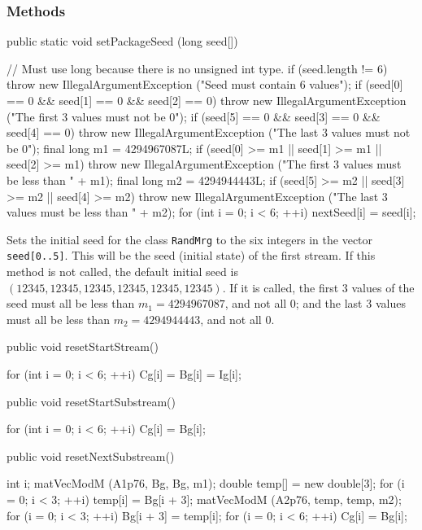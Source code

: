 \subsubsection* {Methods}
\begin{code}

   public static void setPackageSeed (long seed[]) \begin{hide} {
      // Must use long because there is no unsigned int type.
      if (seed.length != 6)
         throw new IllegalArgumentException ("Seed must contain 6 values");
      if (seed[0] == 0 && seed[1] == 0 && seed[2] == 0)
         throw new IllegalArgumentException ("The first 3 values must not be 0");
      if (seed[5] == 0 && seed[3] == 0 && seed[4] == 0)
         throw new IllegalArgumentException ("The last 3 values must not be 0");
      final long m1 = 4294967087L;
      if (seed[0] >= m1 || seed[1] >= m1 || seed[2] >= m1)
         throw new IllegalArgumentException ("The first 3 values must be less than " + m1);
      final long m2 = 4294944443L;
      if (seed[5] >= m2 || seed[3] >= m2 || seed[4] >= m2)
         throw new IllegalArgumentException ("The last 3 values must be less than " + m2);
      for (int i = 0; i < 6;  ++i)  nextSeed[i] = seed[i];
   }\end{hide}
\end{code}
  \begin{tabb}  Sets the initial seed for the class \texttt{RandMrg} to the 
   six integers in the vector \texttt{seed[0..5]}.
   This will be the seed (initial state) of the first stream.
   If this method is not called, the default initial seed
   is $(12345, 12345, 12345, 12345, 12345, 12345)$.
   If it is called, the first 3 values of the seed must all be
   less than $m_1 = 4294967087$, and not all 0;
   and the last 3 values 
   must all be less than $m_2 = 4294944443$, and not all 0.
 \end{tabb}
\begin{htmlonly}
\end{htmlonly}
\begin{hide}
\begin{code}

   public void resetStartStream() \begin{hide} {
      for (int i = 0; i < 6;  ++i)  Cg[i] = Bg[i] = Ig[i];
   } \end{hide}

   public void resetStartSubstream() \begin{hide} {
      for (int i = 0; i < 6;  ++i)  Cg[i] = Bg[i];
   } \end{hide}

   public void resetNextSubstream() \begin{hide} {
      int i;
      matVecModM (A1p76, Bg, Bg, m1);
      double temp[] = new double[3];
      for (i = 0; i < 3; ++i) temp[i] = Bg[i + 3];
      matVecModM (A2p76, temp, temp, m2);
      for (i = 0; i < 3; ++i) Bg[i + 3] = temp[i];
      for (i = 0; i < 6;  ++i) Cg[i] = Bg[i];
   } \end{hide}
\end{code}
\end{hide}
